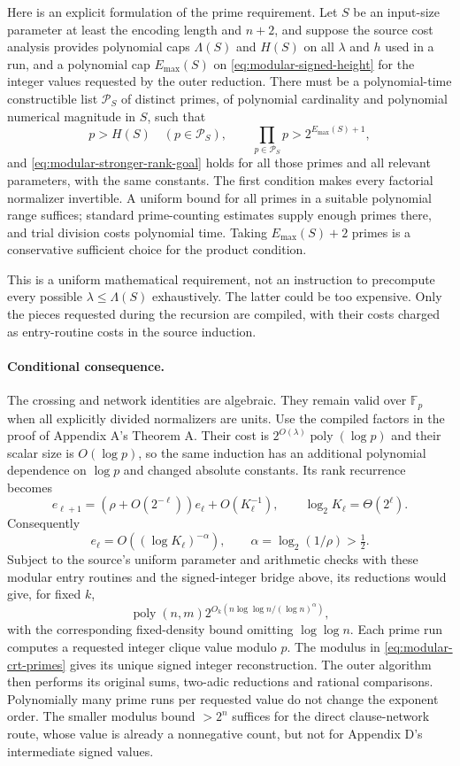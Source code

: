 Here is an explicit formulation of the prime requirement. Let $S$
be an input-size parameter at least the encoding length and $n+2$,
and suppose the source cost analysis provides
polynomial caps $\Lambda(S)$ and $H(S)$ on all $\lambda$ and $h$
used in a run, and a polynomial cap $E_{\max}(S)$ on
\eqref{eq:modular-signed-height} for the integer values requested
by the outer reduction. There must be a polynomial-time constructible list
$\mathcal P_S$ of distinct primes, of polynomial cardinality and
polynomial numerical magnitude in $S$, such that
\begin{equation}\label{eq:modular-crt-primes}
 p>H(S)\quad(p\in\mathcal P_S),\qquad
 \prod_{p\in\mathcal P_S}p>2^{E_{\max}(S)+1},
\end{equation}
and \eqref{eq:modular-stronger-rank-goal} holds for all those primes
and all relevant parameters, with the same constants. The first
condition makes every factorial normalizer invertible. A uniform
bound for all primes in a suitable polynomial range suffices;
standard prime-counting estimates supply enough primes there, and
trial division costs polynomial time. Taking $E_{\max}(S)+2$ primes is a
conservative sufficient choice for the product condition.

This is a uniform mathematical requirement, not an instruction to
precompute every possible $\lambda\le\Lambda(S)$ exhaustively.
The latter could be too expensive. Only the pieces requested during
the recursion are compiled, with their costs charged as entry-routine
costs in the source induction.

\paragraph{Conditional consequence.}
The crossing and network identities are algebraic. They remain valid
over $\mathbb F_p$ when all explicitly divided normalizers are units.
Use the compiled factors in the proof of Appendix A's Theorem A.
Their cost is $2^{O(\lambda)}\operatorname{poly}(\log p)$ and their
scalar size is $O(\log p)$, so the same induction has an additional
polynomial dependence on $\log p$ and changed absolute constants.
Its rank recurrence becomes
\[
 e_{\ell+1}=(\rho+O(2^{-\ell}))e_\ell+O(K_\ell^{-1}),
 \qquad \log_2K_\ell=\Theta(2^\ell).
\]
Consequently
\[
 e_\ell=O((\log K_\ell)^{-\alpha}),\qquad
 \alpha=\log_2(1/\rho)>\tfrac12.
\]
Subject to the source's uniform parameter and arithmetic checks with
these modular entry routines and the signed-integer bridge above,
its reductions would give, for fixed $k$,
\[
 \operatorname{poly}(n,m)
 2^{O_k(n\log\log n/(\log n)^\alpha)},
\]
with the corresponding fixed-density bound omitting $\log\log n$.
Each prime run computes a requested integer clique value modulo $p$.
The modulus in \eqref{eq:modular-crt-primes} gives its unique signed
integer reconstruction. The outer algorithm then performs its
original sums, two-adic reductions and rational comparisons.
Polynomially many prime runs per requested value do not change the
exponent order. The smaller modulus bound $>2^n$ suffices for the
direct clause-network route, whose value is already a nonnegative
count, but not for Appendix D's intermediate signed values.

